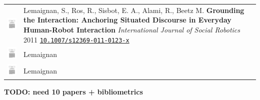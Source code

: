 \documentclass[11pt]{report}
\newcommand{\TODO}[1]{{\color{red}\textbf{TODO: #1}}}
\begin{document}
\begin{tabular}{p{1.8cm}p{6cm}p{7cm}}
    \vspace{0cm}\includegraphics[width=2cm]{thumbs/2019-science.jpg} &

    Lemaignan, S., Ros, R., Sisbot, E. A., Alami, R., Beetz M. \textbf{Grounding
    the Interaction: Anchoring Situated Discourse in Everyday Human-Robot
    Interaction} 
    \newline \textit{International Journal of Social Robotics} 2011
    \newline \texttt{\href{https://doi.org/10.1007/s12369-011-0123-x}{10.1007/s12369-011-0123-x}}
    & \small \\


    \vspace{0cm}\includegraphics[width=2cm]{thumbs/2019-science.jpg} &
    Lemaignan
    & \small \\


    \vspace{0cm}\includegraphics[width=2cm]{thumbs/2019-science.jpg} &
    Lemaignan
    & \small \\




\end{tabular}

\TODO{need 10 papers + bibliometrics}
\end{document}
